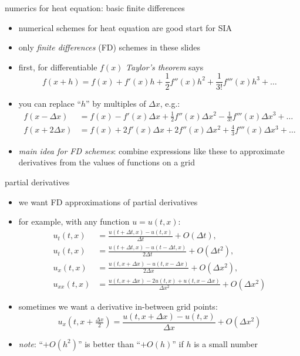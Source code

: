 \begin{frame}{numerics for heat equation: basic finite differences}

\begin{itemize}
\item numerical schemes for heat equation are good start for SIA
\item only \emph{finite differences} (FD) schemes in these slides

\bigskip
\item first, for differentiable $f(x)$ \emph{Taylor's theorem} says
	$$f(x+h) = f(x) + f'(x) h + \frac{1}{2} f''(x) h^2 + \frac{1}{3!} f'''(x) h^3 + \dots$$
\normalsize
\item you can replace ``$h$'' by multiples of $\Delta x$, e.g.:
\small
\begin{align*}
f(x-\Delta x) &= f(x) - f'(x) \Delta x + \frac{1}{2} f''(x) \Delta x^2 - \frac{1}{3!} f'''(x) \Delta x^3 + \dots \\
f(x+2\Delta x) &= f(x) + 2 f'(x) \Delta x + 2 f''(x) \Delta x^2 + \frac{4}{3} f'''(x) \Delta x^3 + \dots
\end{align*}
\normalsize
\item \emph{main idea for FD schemes}:  combine expressions like these to approximate derivatives from the values of functions on a grid
\end{itemize}
\end{frame}


\begin{frame}{partial derivatives}

\begin{itemize}
\item we want FD approximations of partial derivatives
\item for example, with any function $u=u(t,x)$:
\small
\begin{align*}
u_t(t,x) &= \frac{u(t+\Delta t,x) - u(t,x)}{\Delta t} + O(\Delta t), \\
u_t(t,x) &= \frac{u(t+\Delta t,x) - u(t-\Delta t,x)}{2\Delta t} + O(\Delta t^2), \\
u_x(t,x) &= \frac{u(t,x+\Delta x) - u(t,x-\Delta x)}{2\Delta x} + O(\Delta x^2), \\
u_{xx}(t,x) &= \frac{u(t,x+\Delta x) - 2 u(t,x) + u(t,x-\Delta x)}{\Delta x^2} + O(\Delta x^2)
\end{align*}
\normalsize
\item sometimes we want a derivative in-between grid points:
\small
	$$u_x(t,x+\tfrac{\Delta x}{2}) = \frac{u(t,x+\Delta x) - u(t,x)}{\Delta x} + O(\Delta x^2)$$
\normalsize
\item \emph{note}: ``$+O(h^2)$'' is better than ``$+O(h)$'' if $h$ is a small number
\end{itemize}
\end{frame}


